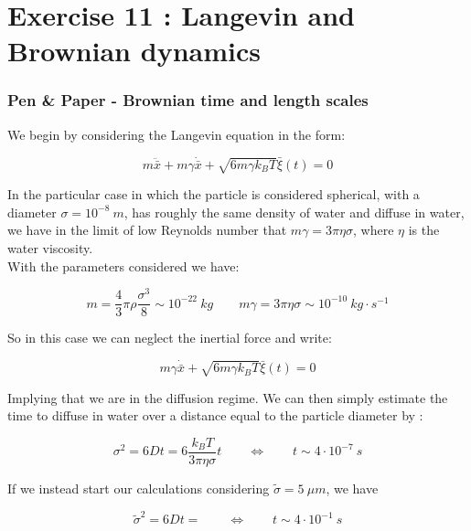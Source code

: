 \chapter*{Exercise 11 : Langevin and Brownian dynamics}
\subsection*{Pen \& Paper - Brownian time and length scales}
We begin by considering the Langevin equation in the form:

$$ m\ddot{\bar{x}} + m\gamma\dot{\bar{x}} + \sqrt{6 m \gamma k_BT} \bar{\xi}(t) = 0 $$

In the particular case in which the particle is considered spherical, with a diameter $\sigma = 10^{-8}\ m$, has roughly the same density of water and diffuse in water, we have
in the limit of low Reynolds number that $m\gamma = 3 \pi \eta \sigma$, where $\eta$ is the water viscosity.\\
With the parameters considered we have:

$$ m = \frac{4}{3}\pi \rho\frac{\sigma^3}{8} \sim 10^{-22}\ kg \qquad m\gamma = 3 \pi \eta \sigma \sim 10^{-10}\ kg \cdot s^{-1} $$

So in this case we can neglect the inertial force and write:

$$ m\gamma\dot{\bar{x}} + \sqrt{6 m \gamma k_BT} \bar{\xi}(t) = 0 $$

Implying that we are in the diffusion regime. We can then simply estimate the time to diffuse in water over a distance equal to the particle diameter by :

$$ \sigma ^ 2 = 6Dt = 6 \frac{k_BT}{3\pi\eta\sigma} t \qquad \iff \qquad t \sim 4 \cdot 10^{-7}\ s $$

If we instead start our calculations considering $\tilde{\sigma} = 5 \ \mu m$, we have

$$ \tilde{\sigma} ^ 2 = 6Dt = \qquad \iff \qquad t \sim 4 \cdot 10^{-1}\ s $$
